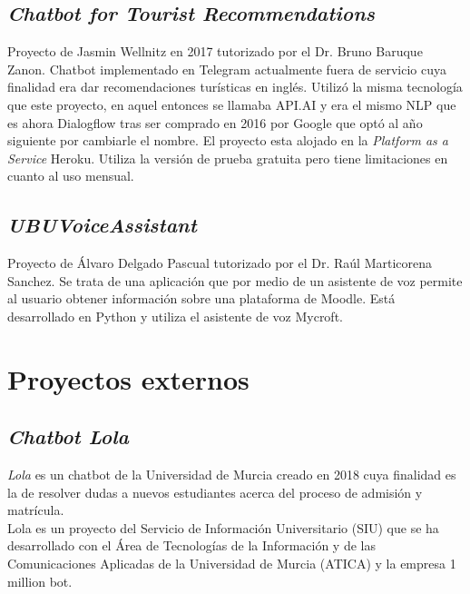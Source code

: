 \subsection{\emph{Chatbot for Tourist Recommendations}}

Proyecto de Jasmin Wellnitz en 2017 tutorizado por el Dr. Bruno Baruque Zanon. 
Chatbot implementado en Telegram actualmente fuera de servicio cuya finalidad era dar recomendaciones turísticas en inglés.
Utilizó la misma tecnología que este proyecto, en aquel entonces se llamaba API.AI y era el mismo NLP que es ahora Dialogflow tras ser comprado en 2016 por Google que optó al año siguiente por cambiarle el nombre.
El proyecto esta alojado en la \textit{Platform as a Service} Heroku. Utiliza la versión de prueba gratuita pero tiene limitaciones en cuanto al uso mensual. \cite{ChatbotTourist}


\subsection{\emph{UBUVoiceAssistant}}


Proyecto de Álvaro Delgado Pascual tutorizado por el Dr. Raúl Marticorena Sanchez.
Se trata de una aplicación que por medio de un asistente de voz permite al usuario obtener información sobre una plataforma de Moodle. Está desarrollado en Python y utiliza el asistente de voz Mycroft. \cite{UBUVoiceAssistant}

\newpage
\section{Proyectos externos}

\subsection{\emph{Chatbot Lola}}

\textit{Lola} es un chatbot de la Universidad de Murcia creado en 2018 cuya finalidad es la de resolver dudas a nuevos estudiantes acerca del proceso de admisión y matrícula.\\
Lola es un proyecto del Servicio de  Información Universitario (SIU) que se ha desarrollado con el Área de Tecnologías de la Información y de las Comunicaciones Aplicadas de la Universidad de Murcia (ATICA) y la empresa 1 million bot. \cite{Lola}\\

